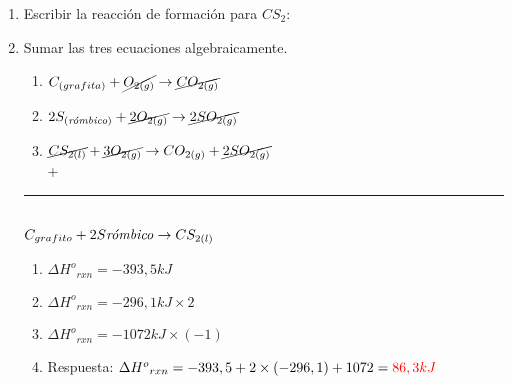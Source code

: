         \begin{enumerate}
            \item Escribir la reacción de formación para $CS_2$:

            \item Sumar las tres ecuaciones algebraicamente.
            \begin{minipage}{8cm}
                \begin{center}
                \begin{enumerate}
                    \item $C_{(grafita)} + \cancel{O_{2(g)}} \rightarrow \cancel{CO_{2(g)}} $ \\[5pt]
                    \item $2S_{\text{(\textit{rómbico})}} + \cancel{2O_{2(g)}} \rightarrow \cancel{2SO_{2(g)}}$ \\[5pt]
                    \item $\cancel{CS_{2(l)}} + \cancel{3O_{2(g)}} \rightarrow CO_{2(g)} + \cancel{2SO_{2(g)}}$ \\[5pt]
                    +
                \end{enumerate}
                \rule{6cm}{0.05mm} \\[5pt]
                $C_{grafito} + 2S{\text{\textit{rómbico}}} \rightarrow CS_{2(l)}$
                \end{center}
            \end{minipage}
            \begin{enumerate}
                \item $\Delta {H^o}_{rxn} = -393,5 kJ$ 
                \item $\Delta {H^o}_{rxn} = -296,1 kJ \times 2$
                \item $\Delta {H^o}_{rxn} = -1072kJ \times (-1)$
                \item Respuesta: $\Delta {H^o}_{rxn} = -393,5 + 2 \times (-296,1)+ 1072 = \textcolor{red}{86,3 kJ}$
            \end{enumerate}
        \end{enumerate}
        \saltoPag{}

